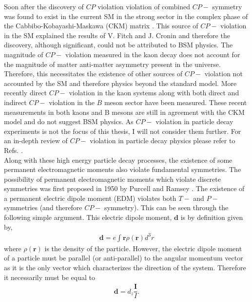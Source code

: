 \documentclass[10pt,a4paper, twoside, openright]{report}
\begin{document}
\linebreak
Soon after the discovery of $CP$ violation violation of combined $CP-$ symmetry was found to exist in the current SM in the strong sector in the complex phase of the Cabbibo-Kobayashi-Maskawa (CKM) matrix \cite{Cabibbo1963, KM1973, Kobayashi2009, Maskawa2009}. This source of $CP-$ violation in the SM explained the results of V. Fitch and J. Cronin and therefore the discovery, although significant, could not be attributed to BSM physics. The magnitude of  $CP-$ violation measured in the kaon decay does not account for the magnitude of matter anti-matter asymmetry present in the universe. Therefore, this necessitates the existence of other sources of $CP-$ violation not accounted by the SM and therefore physics beyond the standard model. More recently direct $CP-$ violation in the kaon systems \cite{Alavi1999, Fanti1999} along with both direct and indirect $CP-$ violation in the $B$ meson sector \cite{Belle2001, Aaij2013, Aubert2003} have been measured. These recent measurements in both kaons and B mesons are still in agreement with the CKM model and do not suggest BSM physics.  As $CP-$ violation in particle decay experiments is not the focus of this thesis, I will not  consider them further. For an in-depth review of $CP-$ violation in particle decay physics please refer to Refs. \cite{Winstein1993, Artuso2016, Hurth2013, Kim2010, Cirigliano2012, Branco2012, Bernabeu2015, Bertolini2000}. \\
\linebreak
Along with these high energy particle decay processes, the existence of some permanent electromagnetic moments also violate fundamental symmetries. The possibility of permanent electromagnetic moments which violate  discrete symmetries was first proposed in 1950 by Purcell and Ramsey  \cite{Purcell1950}. The existence of a permanent electric dipole moment (EDM) violates both $T-$ and $P-$ symmetries (and therefore $CP-$ symmetry)\cite{Landau1957}. This can be seen through the following simple argument. This electric dipole moment, $\textbf{d}$ is by definition given by,  
\begin{align} \label{eq:edm1}
\textbf{d} = e\int \textbf{r}\rho(\textbf{r})d^3r
\end{align}
where $\rho(\textbf{r})$ is the density of the particle. However, the electric dipole moment of a particle must be parallel (or anti-parallel) to the angular momentum vector as it is the only vector which characterizes the direction of the system. Therefore it necessarily must be equal to
\begin{align} \label{eq:edm2}
\textbf{d}  = d_z \dfrac{\textbf{I}}{I}.
\end{align}
\end{document}
